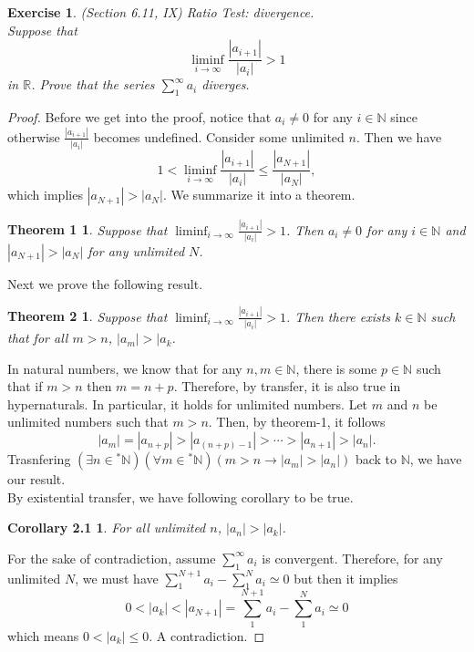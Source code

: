 \documentclass[a4paper, 11pt]{book}
\theoremstyle{plain}
\newtheorem{exercise}{Exercise}[chapter]
\newtheorem*{theorem1}{Theorem 1}
\newtheorem*{theorem2}{Theorem 2}
\newtheorem*{corollary2.1}{Corollary 2.1}
\theoremstyle{plain}
\newcommand{\arr}{\rightarrow}
\newcommand{\N}{\mathbb{N}}
\newcommand{\R}{\mathbb{R}}
\newcommand{\hyp}{{}^*}
\begin{document}
  \begin{exercise}
    (Section 6.11, IX) Ratio Test: divergence. \\
    Suppose that $$\liminf_{i \arr \infty} \frac{|a_{i+1}|}{|a_i|}>1$$
    in $\R$. Prove that the series $\sum_{1}^\infty a_i$ diverges.
  \end{exercise}
  \begin{proof}
    Before we get into the proof, notice that $a_i \not = 0$ for any $i \in \N$ since otherwise $\frac{|a_{i+1}|}{|a_i|}$ becomes undefined. Consider some unlimited $n$. Then we have $$1<\liminf_{i \arr \infty} \frac{|a_{i+1}|}{|a_i|} \leq \frac{|a_{N+1}|}{|a_N|}, $$ 
    which implies $|a_{N+1}|>|a_N|$. We summarize it into a theorem. 
    \begin{theorem1}
      Suppose that $\liminf_{i \arr \infty} \frac{|a_{i+1}|}{|a_i|}>1$. Then $a_i \not =0$ for any $i \in \N$ and $|a_{N+1}|>|a_N|$ for any unlimited $N$. 
    \end{theorem1}
    Next we prove the following result. 
    \begin{theorem2}
      Suppose that $\liminf_{i \arr \infty} \frac{|a_{i+1}|}{|a_i|}>1$. Then there exists $k \in \N$ such that for all $m>n$, $|a_m|>|a_k$.
    \end{theorem2}
     In natural numbers, we know that for any $n,m \in \N$, there is some $p \in \N$ such that if $m>n$ then $m=n+p$. Therefore, by transfer, it is also true in hypernaturals. In particular, it holds for unlimited numbers. Let $m$ and $n$ be unlimited numbers such that $m>n$. Then, by theorem-1, it follows $$|a_m|=|a_{n+p}|>|a_{(n+p)-1}|>\cdots >|a_{n+1}|>|a_n|.$$
    Trasnfering $(\exists n \in \hyp \N)(\forall m \in \hyp \N)(m>n \arr |a_m|>|a_n|)$ back to $\N$, we have our result. \\

    By existential transfer, we have following corollary to be true. 
    \begin{corollary2.1}
      For all unlimited $n$, $|a_n|>|a_k|$.
    \end{corollary2.1}

    For the sake of contradiction, assume $\sum_{1}^\infty a_i$ is convergent. Therefore, for any unlimited $N$, we must have $\sum_{1}^{N+1} a_i - \sum_{1}^{N} a_i \simeq 0$ but then it implies $$0<|a_k|<|a_{N+1}|=\sum_{1}^{N+1} a_i - \sum_{1}^{N} a_i \simeq 0$$
    which means $0<|a_k| \leq 0$. A contradiction.
  \end{proof}
\end{document}
